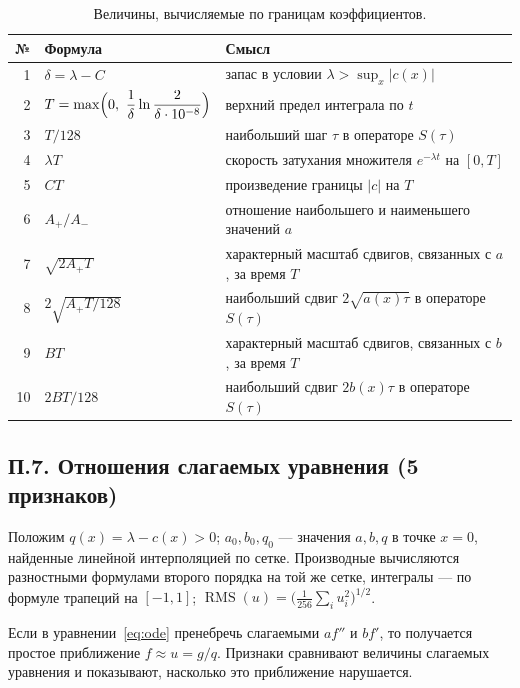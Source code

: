\documentclass[14pt,a4paper]{extarticle}
\begin{document}
\begin{table}[!htbp]
\centering
\caption{Величины, вычисляемые по границам коэффициентов.}
\label{tab:app-derived}
\renewcommand{\arraystretch}{1.25}
\begin{tabular}{rl>{\raggedright\arraybackslash}p{}}
\toprule
№ & Формула & Смысл\\
\midrule
1 & $\delta=\lambda-C$ & запас в условии $\lambda>\sup_x|c(x)|$\\
2 & $T=\max\Bigl(0,\ \dfrac1\delta\ln\dfrac{2}{\delta\cdot10^{-8}}\Bigr)$ & верхний предел интеграла по $t$\\[8pt]
3 & $T/128$ & наибольший шаг $\tau$ в операторе $S(\tau)$\\
4 & $\lambda T$ & скорость затухания множителя $e^{-\lambda t}$ на $[0,T]$\\
5 & $CT$ & произведение границы $|c|$ на $T$\\
6 & $A_+/A_-$ & отношение наибольшего и наименьшего значений $a$\\
7 & $\sqrt{2A_+T}$ & характерный масштаб сдвигов, связанных с $a$, за время $T$\\
8 & $2\sqrt{A_+T/128}$ & наибольший сдвиг $2\sqrt{a(x)\tau}$ в операторе $S(\tau)$\\
9 & $BT$ & характерный масштаб сдвигов, связанных с $b$, за время $T$\\
10 & $2BT/128$ & наибольший сдвиг $2b(x)\tau$ в операторе $S(\tau)$\\
\bottomrule
\end{tabular}
\end{table}

\subsection*{П.7. Отношения слагаемых уравнения (5 признаков)}
Положим $q(x)=\lambda-c(x)>0$; $a_0,b_0,q_0$ --- значения $a,b,q$ в точке
$x=0$, найденные линейной интерполяцией по сетке. Производные вычисляются
разностными формулами второго порядка на той же сетке, интегралы ---
по формуле трапеций на $[-1,1]$; $\operatorname{RMS}(u)=
\bigl(\frac1{256}\sum_iu_i^2\bigr)^{1/2}$.

Если в уравнении~\eqref{eq:ode} пренебречь слагаемыми $af''$ и $bf'$,
то получается простое приближение $f\approx u=g/q$. Признаки сравнивают
величины слагаемых уравнения и показывают, насколько это приближение
нарушается.
\end{document}
